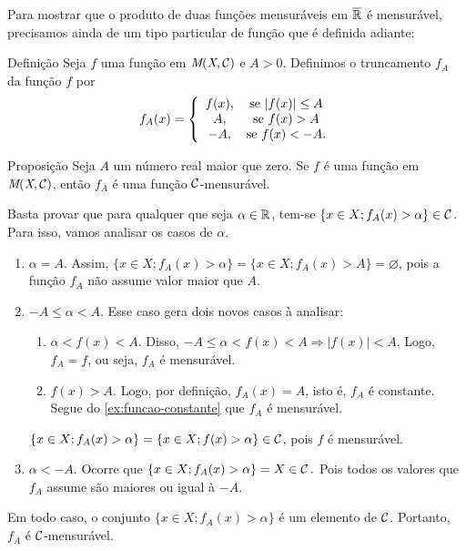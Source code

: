 Para mostrar que o produto de duas funções mensuráveis em $\operatorname{\overline{\mathbb{R}}}$ é mensurável, precisamos ainda de um tipo particular de função que é definida adiante:
\begin{env}{Definição}
	Seja $f$ uma função em $\operatorname{\textit{M}(\textit{X}, \mathcal{C} )}$ e $A > 0$.
	Definimos o truncamento $f_A$ da função $f$ por
	$$ f_A(x) =
	\left\{\begin{array}{cc}
		f(x), & \textrm{se\ } |f(x)| \leq A \\
		A, & \textrm{se\ } f(x) > A \\
		-A, & \textrm{se\ } f(x) < -A.
	\end{array}\right.
	\vspace{-0.4cm}
	$$
\end{env}
\begin{env}{Proposição}
	\label{prop:truncamento-mensurável}
	Seja $A$ um número real maior que zero.
	Se $f$ é uma função em $\operatorname{\textit{M}(\textit{X}, \mathcal{C} )}$, então $f_A$ é uma função $\operatorname{\mathcal{C}}$-mensurável.
\end{env}
\begin{prova}
	Basta provar que para qualquer que seja $\alpha \in \mathbb{R}$, tem-se $\{x \in X; f_A(x) > \alpha\} \in \operatorname{\mathcal{C}}$.
	Para isso, vamos analisar os casos de $\alpha$.
		\begin{enumerate}[label*=(\Roman*)]
			\item $\alpha = A$. 
			Assim, 
			$
			\{x \in X; f_A(x) > \alpha\}
			=
			\{x \in X; f_A(x) > A\}
			= \varnothing
			$, pois a função $f_A$ não assume valor maior que $A$.
			\item $-A \leq \alpha < A$.
			Esse caso gera dois novos casos à analisar:
				\begin{enumerate}
					\item $\alpha < f(x) < A$. 
					Disso, 
					$
					-A \leq \alpha < f(x) < A
					\Rightarrow
					|f(x)| < A
					$.
					Logo, $f_A = f$, ou seja, $f_A$ é mensurável.
					\item $f(x) > A$.
					Logo, por definição, $f_A(x) = A$, isto é, $f_A$ é constante.
					Segue do \ref{ex:funcao-constante} que $f_A$ é mensurável.
				\end{enumerate} 
			$
			\{x \in X; f_A(x) > \alpha\}
			=
			\{x \in X; f(x) > \alpha\}
			\in \operatorname{\mathcal{C}}
			$, 
			pois $f$ é mensurável.
			\item $\alpha < -A$.
			Ocorre que
			$
			\{x \in X; f_A(x) > \alpha \} = X \in \operatorname{\mathcal{C}}.
			$
			Pois todos os valores que $f_A$ assume são maiores ou igual à $-A$.
		\end{enumerate}
	Em todo caso, o conjunto $\{x \in X; f_A(x) > \alpha\}$ é um elemento de $\operatorname{\mathcal{C}}$.
	Portanto, $f_A$ é $\operatorname{\mathcal{C}}$-mensurável. 
\end{prova}


